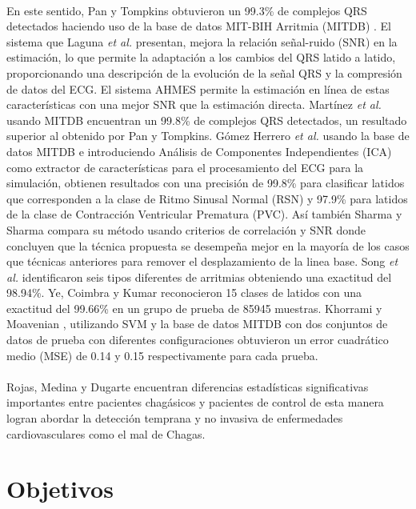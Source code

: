 \documentclass[spanish,11pt,letterpaper,oneside]{memoir}
\begin{document}
    \\
    En este sentido, Pan y Tompkins obtuvieron un 99.3\% de complejos QRS detectados haciendo uso de la base de datos MIT-BIH Arritmia (MITDB) \cite{PanTompkins85}. El sistema que Laguna \textit{et al.} \cite{Laguna97} presentan, mejora la relación señal-ruido (SNR) en la estimación, lo que permite la adaptación a los cambios del QRS latido a latido, proporcionando una descripción de la evolución de la señal QRS y la compresión de datos del ECG. El sistema AHMES permite la estimación en línea de estas características con una mejor SNR que la estimación directa. Martínez \textit{et al.} \cite{Martinez04} usando MITDB encuentran un 99.8\% de complejos QRS detectados, un resultado superior al obtenido por Pan y Tompkins. Gómez Herrero \textit{et al.} \cite{Herrero05} usando la base de datos MITDB e introduciendo Análisis de Componentes Independientes (ICA) como extractor de características para el procesamiento del ECG para la simulación, obtienen resultados con una precisión de 99.8\% para clasificar latidos que corresponden a la clase de Ritmo Sinusal Normal (RSN) y 97.9\% para latidos de la clase de Contracción Ventricular Prematura (PVC). Así también Sharma y Sharma \cite{Sharma15} compara su método usando criterios de correlación y SNR donde concluyen que la técnica propuesta se desempeña mejor en la mayoría de los casos que técnicas anteriores para remover el desplazamiento de la linea base. Song \textit{et al.} \cite{Song05} identificaron seis tipos diferentes de arritmias obteniendo una exactitud del 98.94\%. Ye, Coimbra y Kumar \cite{Ye10} reconocieron 15 clases de latidos con una exactitud del 99.66\% en un grupo de prueba de 85945 muestras. Khorrami y Moavenian \cite{Khorrami10}, utilizando SVM y la base de datos MITDB con dos conjuntos de datos de prueba con diferentes configuraciones obtuvieron un error cuadrático medio (MSE) de 0.14 y 0.15 respectivamente para cada prueba.\\
    \\
    Rojas, Medina y Dugarte \cite{Dugarte11} encuentran diferencias estadísticas significativas importantes entre pacientes chagásicos y pacientes de control de esta manera logran abordar la detección temprana y no invasiva de enfermedades cardiovasculares como el mal de Chagas.   \\
 

\section{Objetivos}
\end{document}
